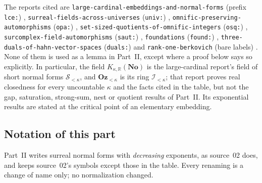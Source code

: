 \documentclass[11pt,letterpaper]{article}
\numberwithin{equation}{section}
\theoremstyle{definition}
\theoremstyle{remark}
\newcommand{\R}{\mathbb R}
\newcommand{\No}{\mathbf{No}}
\newcommand{\Oz}{\mathbf{Oz}}
\newcommand{\KN}[2]{K_{#1,#2}(\No)}%
\newcommand{\Ok}{\Oz_{<\kappa}}
\newcommand{\lbl}[1]{\nolinkurl{#1}}%
\begin{document}
The reports cited are \nolinkurl{large-cardinal-embeddings-and-normal-forms} (prefix \lbl{lce:}) \cite{CollLCE}, \nolinkurl{surreal-fields-across-universes} (\lbl{univ:}) \cite{CollUniv}, \nolinkurl{omnific-preserving-automorphisms} (\lbl{opa:}) \cite{CollOPA}, \nolinkurl{set-sized-quotients-of-omnific-integers} (\lbl{osq:}) \cite{CollOSQ}, \nolinkurl{surcomplex-field-automorphisms} (\lbl{saut:}) \cite{CollSAUT}, \nolinkurl{foundations} (\lbl{found:}) \cite{CollFound}, \nolinkurl{three-duals-of-hahn-vector-spaces} (\lbl{duals:}) \cite{CollDuals} and \nolinkurl{rank-one-berkovich} (bare labels) \cite{CollBerk}. None of them is used as a lemma in Part~II, except where a proof below says so explicitly. In particular, the field $\KN\kappa\R$ is the large-cardinal report's field of short normal forms $\mathscr S_{<\kappa}$, and $\Ok$ is its ring $\mathscr I_{<\kappa}$; that report proves real closedness for every uncountable $\kappa$ and the facts cited in the table, but not the gap, saturation, strong-sum, nest or quotient results of Part~II. Its exponential results are stated at the critical point of an elementary embedding.

\subsection{Notation of this part}
\label{fkc:sb:sub:notation}

Part~II writes surreal normal forms with \emph{decreasing} exponents, as source~02 does, and keeps source~02's symbols except those in the table. Every renaming is a change of name only; no normalization changed.
\end{document}
